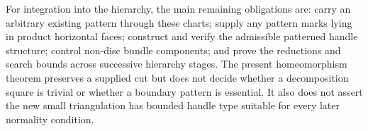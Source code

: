 For integration into the hierarchy, the main remaining obligations are:
carry an arbitrary existing pattern through these charts; supply any
pattern marks lying in product horizontal faces; construct and verify the
admissible patterned handle structure; control non-disc bundle components;
and prove the reductions and search bounds across successive hierarchy
stages.  The present homeomorphism theorem preserves a supplied cut but does
not decide whether a decomposition square is trivial or whether a boundary
pattern is essential.  It also does not assert the new small triangulation
has bounded handle type suitable for every later normality condition.


